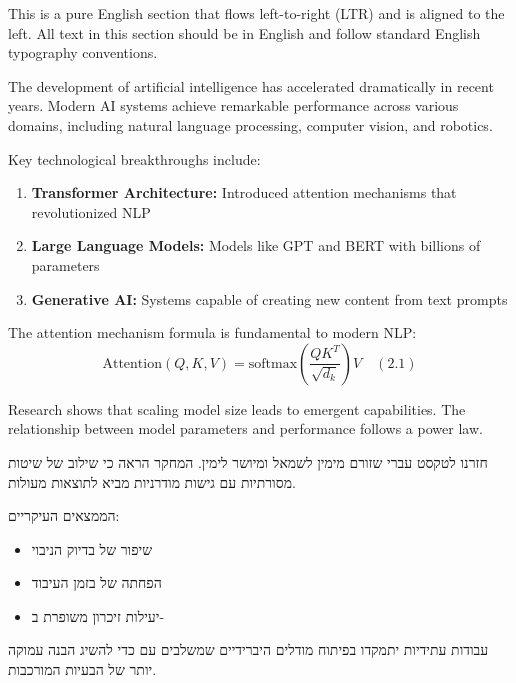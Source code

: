 \documentclass{hebrew-academic-template}
\begin{document}

\startenglish

This is a pure English section that flows left-to-right (LTR) and is aligned to the left. All text in this section should be in English and follow standard English typography conventions.

The development of artificial intelligence has accelerated dramatically in recent years. Modern AI systems achieve remarkable performance across various domains, including natural language processing, computer vision, and robotics.

Key technological breakthroughs include:
\begin{enumerate}
\item \textbf{Transformer Architecture:} Introduced attention mechanisms that revolutionized NLP
\item \textbf{Large Language Models:} Models like GPT and BERT with billions of parameters  
\item \textbf{Generative AI:} Systems capable of creating new content from text prompts
\end{enumerate}

The attention mechanism formula is fundamental to modern NLP:
$$\text{Attention}(Q,K,V) = \text{softmax}\left(\frac{QK^T}{\sqrt{d_k}}\right)V \quad (2.1)$$

Research shows that scaling model size leads to emergent capabilities. The relationship between model parameters and performance follows a power law.

\stopenglish



חזרנו לטקסט עברי שזורם מימין לשמאל ומיושר לימין. המחקר הראה כי שילוב של שיטות  מסורתיות עם גישות  מודרניות מביא לתוצאות מעולות.

הממצאים העיקריים:
\begin{itemize}
\item שיפור של  בדיוק הניבוי
\item הפחתה של  בזמן העיבוד
\item יעילות זיכרון משופרת ב-
\end{itemize}

עבודות עתידיות יתמקדו בפיתוח מודלים היברידיים שמשלבים  עם  כדי להשיג הבנה עמוקה יותר של הבעיות המורכבות.


\newpage
\printenglishbibliography
\end{document}
